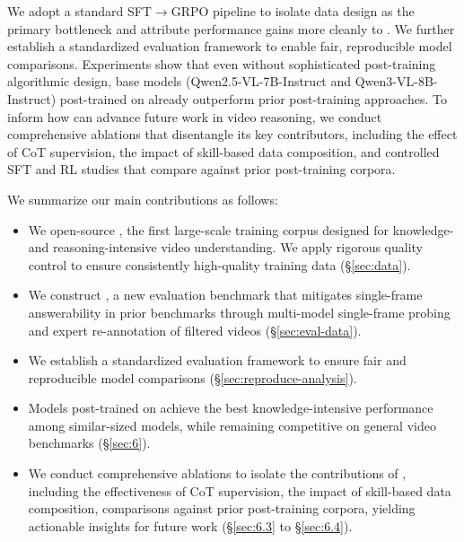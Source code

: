 We adopt a standard SFT$\rightarrow$GRPO pipeline to isolate data design as the primary bottleneck and attribute performance gains more cleanly to \ours. We further establish a standardized evaluation framework to enable fair, reproducible model comparisons. Experiments show that even without sophisticated post-training algorithmic design, base models (\ie Qwen2.5-VL-7B-Instruct and Qwen3-VL-8B-Instruct) post-trained on \ours already outperform prior post-training approaches.
To inform how \ours can advance future work in video reasoning, we conduct comprehensive ablations that disentangle its key contributors, including the effect of CoT supervision, the impact of skill-based data composition, and controlled SFT and RL studies that compare \ours against prior post-training corpora.

We summarize our main contributions as follows:

\begin{itemize} [leftmargin=*, itemsep=-0.15ex, topsep=-0.2ex]
\item We open-source \data, the first large-scale training corpus designed for knowledge- and reasoning-intensive video understanding. We apply rigorous quality control to ensure consistently high-quality training data (\S\ref{sec:data}).
\item We construct \eval, a new evaluation benchmark that mitigates single-frame answerability in prior benchmarks through multi-model single-frame probing and expert re-annotation of filtered videos (\S\ref{sec:eval-data}).
\item We establish a standardized evaluation framework to ensure fair and reproducible model comparisons (\S\ref{sec:reproduce-analysis}). 
\item Models post-trained on \ours achieve the best knowledge-intensive performance among similar-sized models, while remaining competitive on general video benchmarks (\S\ref{sec:6}).
\item We conduct comprehensive ablations to isolate the contributions of \ours, including the effectiveness of CoT supervision, the impact of skill-based data composition, comparisons against prior post-training corpora, yielding actionable insights for future work (\S\ref{sec:6.3} to \S\ref{sec:6.4}).
\end{itemize}
